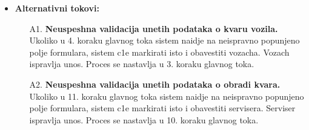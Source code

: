 \begin{itemize}
{\begin{enumerate}
\end{enumerate}

}
\item{\textbf{Alternativni tokovi:} 
\begin{enumerate}
    \item [A1.] \textbf{Neuspeshna validacija unetih podataka o kvaru vozila.} Ukoliko u 4. koraku glavnog toka sistem naidje na neispravno popunjeno polje formulara, sistem c1e markirati isto i obavestiti vozacha. Vozach ispravlja unos. Proces se nastavlja u 3. koraku glavnog toka.
   \item [A2.] \textbf{Neuspeshna validacija unetih podataka o obradi kvara.} Ukoliko u 11. koraku glavnog toka sistem naidje na neispravno popunjeno polje formulara, sistem c1e markirati isto i obavestiti servisera. Serviser ispravlja unos. Proces se nastavlja u 10. koraku glavnog toka.
\end{enumerate}
}
\end{itemize}

